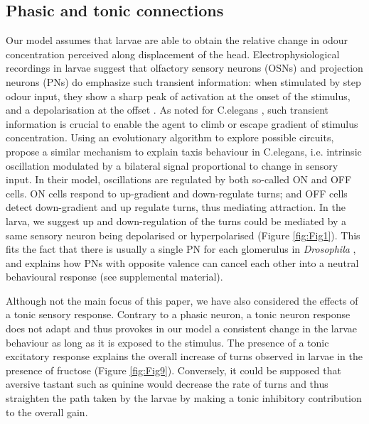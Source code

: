 \documentclass[10pt,a4paper]{article}
\newcommand{\Dros }{\emph{Drosophila }}
\begin{document}
\subsection{Phasic and tonic connections}
Our model assumes that larvae are able to obtain the relative change in odour concentration perceived along displacement of the head.  Electrophysiological recordings in larvae suggest that olfactory sensory neurons (OSNs) and projection neurons (PNs) do emphasize such transient information: when stimulated by step odour input, they show a sharp peak of activation at the onset of the stimulus, and a depolarisation at the offset \cite{schulze2015dynamical}. As noted for C.elegans \citep{lockery2011computational}, such transient information is crucial to enable the agent to climb or escape gradient of stimulus concentration. Using an evolutionary algorithm to explore possible circuits, \cite{izquierdo2010evolution} propose a similar mechanism to explain taxis behaviour in C.elegans, i.e. intrinsic oscillation modulated by a bilateral signal proportional to change in sensory input. In their model, oscillations are regulated by both so-called ON and OFF cells. ON cells respond to up-gradient and down-regulate turns; and OFF cells detect down-gradient and up regulate turns, thus mediating attraction. In the larva, we suggest up and down-regulation of the turns could be mediated by a same sensory neuron being depolarised or hyperpolarised (Figure \ref{fig:Fig1}). This fits the fact that there is usually a single PN for each glomerulus in \Dros {}, and explains how PNs with opposite valence can cancel each other into a neutral behavioural response (see supplemental material). 

Although not the main focus of this paper, we have also considered the effects of a tonic sensory response. Contrary to a phasic neuron, a tonic neuron response does not adapt and thus provokes in our model a consistent change in the larvae behaviour as long as it is exposed to the stimulus. The presence of a tonic excitatory response explains the overall increase of turns observed in larvae in the presence of fructose (Figure \ref{fig:Fig9}). Conversely, it could be supposed that aversive tastant such as quinine would decrease the rate of turns and thus straighten the path taken by the larvae by making a tonic inhibitory contribution to the overall gain. 
\end{document}

